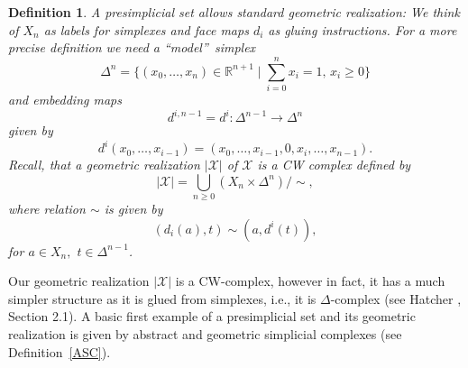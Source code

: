 \documentclass[12pt]{amsart}
\newtheorem{definition}[theorem]{Definition}
\begin{document}
\begin{definition}
A presimplicial set allows standard geometric
realization: We think of $X_{n}$ as labels for simplexes and face maps $%
d_{i} $ as gluing instructions. For a more precise definition we need a \textquotedblleft model\textquotedblright\ simplex
\begin{equation*}
\Delta ^{n}= \{ (x_{0},\ldots ,x_{n})\in \mathbb{R}^{n+1}\mid \sum_{i=0}^{n}x_{i}=1,\,x_{i}\geq 0\}
\end{equation*}
and embedding maps
\begin{equation*}
d^{i,n-1}= d^{i}:\Delta ^{n-1}\rightarrow \Delta^{n}
\end{equation*}
given by 
\begin{equation*}
d^{i}\left( x_{0},\ldots ,x_{i-1}\right) =\left( x_{0},\ldots,x_{i-1},0,x_{i},\ldots,x_{n-1}\right) .
\end{equation*}
Recall, that a geometric realization $\left\vert \mathcal{X}\right\vert $ of $\mathcal{X}$ is a CW complex defined by
\begin{equation*}
\left\vert \mathcal{X}\right\vert =\bigcup\limits_{n\geq 0}\left(
X_{n}\times \Delta ^{n}\right) /\sim ,
\end{equation*}
where relation $\sim $ is given by%
\begin{equation*}
\left( d_{i}(a),t\right) \sim \left( a,d^{i}(t)\right) ,
\end{equation*}
for $a\in X_{n},$ $t\in \Delta ^{n-1}$.
\end{definition}
Our geometric realization $\left\vert \mathcal{X}\right\vert $ is a CW-complex, however in fact, it has a much simpler structure as it is glued from simplexes, i.e., it is $\Delta $-complex (see Hatcher \cite{Hat}, Section 2.1). A basic first example of a presimplicial set and its geometric realization is given by abstract and geometric simplicial complexes (see Definition~\ref{ASC}). 
\end{document}
